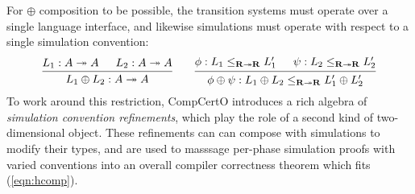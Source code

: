 \documentclass[acmsmall,screen,review,anonymous]{acmart}
\begin{document}
For $\oplus$ composition to be possible,
the transition systems must operate
over a single language interface,
and likewise simulations must operate
with respect to a single simulation convention:
\begin{equation} \label{eqn:hcomp}
  \begin{prooftree}
    \hypo{L_1 : A \twoheadrightarrow A}
    \hypo{L_2 : A \twoheadrightarrow A}
    \infer2{L_1 \oplus L_2 : A \twoheadrightarrow A}
  \end{prooftree}
  \qquad
  \begin{prooftree}
    \hypo{\phi: L_1 \le_{\mathbf{R} \twoheadrightarrow \mathbf{R}} L_1'}
    \hypo{\psi: L_2 \le_{\mathbf{R} \twoheadrightarrow \mathbf{R}} L_2'}
    \infer2{\phi \oplus \psi :
      L_1 \oplus L_2 \le_{\mathbf{R} \twoheadrightarrow \mathbf{R}} L_1' \oplus L_2'}
  \end{prooftree}
\end{equation}
To work around this restriction,
CompCertO introduces a rich algebra of \emph{simulation convention refinements},
which play the role of a second kind of two-dimensional object.
These refinements can can compose
with simulations to modify their types,
and are used to masssage per-phase
simulation proofs with varied conventions into
an overall compiler correctness theorem
which fits (\ref{eqn:hcomp}).

\end{document}
